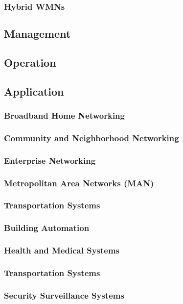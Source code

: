 \documentclass[11pt,a4paper]{report}
\begin{document}
\subsubsection{Hybrid WMNs}

\subsection{Management}
\subsection{Operation}
\subsection{Application}
\subsubsection{Broadband Home Networking}
\subsubsection{Community and Neighborhood Networking}
\subsubsection{Enterprise Networking}
\subsubsection{Metropolitan Area Networks (MAN)}
\subsubsection{Transportation Systems}
\subsubsection{Building Automation}
\subsubsection{Health and Medical Systems}
\subsubsection{Transportation Systems}
\subsubsection{Security Surveillance Systems}
\end{document}
